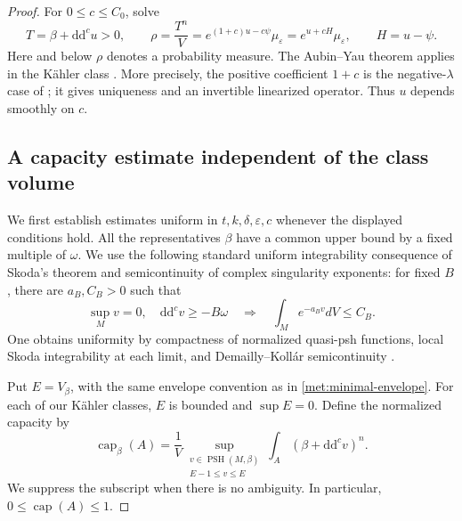 \documentclass[11pt,letterpaper]{article}
\theoremstyle{definition}
\theoremstyle{remark}
\begin{document}
\begin{proof}
For \(0\leq c\leq C_0\), solve
\begin{equation}
 \label{met:ma-family}
 T=\beta+\mathrm{d}\mathrm{d}^{c} u>0,
 \qquad
 \rho=\frac{T^n}{V}
   =e^{(1+c)u-c\psi}\mu_\varepsilon
   =e^{u+cH}\mu_\varepsilon,
 \qquad H=u-\psi.
\end{equation}
Here and below \(\rho\) denotes a probability measure.  The
Aubin--Yau theorem applies in the K\"ahler class
\cite{AubinMongeAmpere,YauCalabi}.  More precisely, the positive
coefficient \(1+c\) is the negative-\(\lambda\) case of
\cite[Theorem 7.14]{AubinBook1998}; it gives uniqueness and an
invertible linearized operator.  Thus \(u\) depends smoothly on \(c\).

\subsection*{A capacity estimate independent of the class volume}

We first establish estimates uniform in \(t,k,\delta,\varepsilon,c\)
whenever the displayed conditions hold.  All the representatives
\(\beta\) have a common upper bound by a fixed multiple of \(\omega\).
We use the following standard uniform integrability consequence of
Skoda's theorem and semicontinuity of complex singularity exponents:
for fixed \(B\), there are \(a_B,C_B>0\) such that
\begin{equation}
 \label{met:uniform-skoda}
 \sup_M v=0,\quad \mathrm{d}\mathrm{d}^{c} v\geq-B\omega
 \quad\Longrightarrow\quad
 \int_M e^{-a_Bv}dV\leq C_B.
\end{equation}
One obtains uniformity by compactness of normalized quasi-psh
functions, local Skoda integrability at each limit, and
Demailly--Koll\'ar semicontinuity
\cite{SkodaIntegrability,DemaillyKollar}.

Put \(E=V_\beta\), with the same envelope convention as in
\eqref{met:minimal-envelope}.  For each of our K\"ahler classes, \(E\)
is bounded and \(\sup E=0\).  Define the normalized capacity by
\begin{equation}
 \label{met:capacity}
 \operatorname{cap}_\beta(A)
 =\frac1V\sup_{\substack{v\in\operatorname{PSH}(M,\beta)\\E-1\leq v\leq E}}
       \int_A(\beta+\mathrm{d}\mathrm{d}^{c} v)^n.
\end{equation}
We suppress the subscript when there is no ambiguity.  In particular,
\(0\leq\operatorname{cap}(A)\leq1\).


\end{proof}
\end{document}
